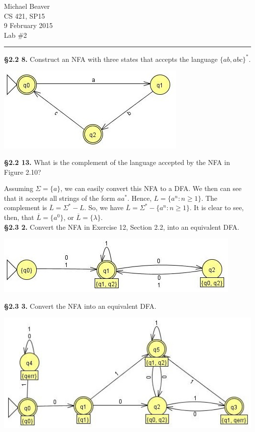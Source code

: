 \documentclass[12pt,letter]{article}
\begin{document}
Michael Beaver\\
CS 421, SP15\\
9 February 2015 \\
Lab \#2 
\hrule

\textbf{\S 2.2 8.} Construct an NFA with three states that accepts the language $\lbrace ab, abc \rbrace ^*$.

\begin{center}
	\includegraphics{"images/Lab 2 - 8"}
\end{center}


\textbf{\S 2.2 13.} What is the complement of the language accepted by the NFA in Figure 2.10?

Assuming $\Sigma = \lbrace a \rbrace$, we can easily convert this NFA to a DFA. We then can see that it accepts all strings of the form $aa^*$. Hence, $L = \lbrace a^n : n \geq 1 \rbrace$. The complement is $\overline{L} = \Sigma ^* - L$. So, we have $\overline{L} = \Sigma ^* - \lbrace a^n : n \geq 1 \rbrace$. It is clear to see, then, that $\overline{L} = \lbrace a^0 \rbrace$, or $\overline{L} = \lbrace \lambda \rbrace$. \\


\textbf{\S 2.3 2.} Convert the NFA in Exercise 12, Section 2.2, into an equivalent DFA.

\begin{center}
	\includegraphics{"images/Lab 2 - 2"}
\end{center}


\textbf{\S 2.3 3.} Convert the NFA into an equivalent DFA.

\begin{center}
	\includegraphics{"images/Lab 2 - 3"}
\end{center}
\end{document}

